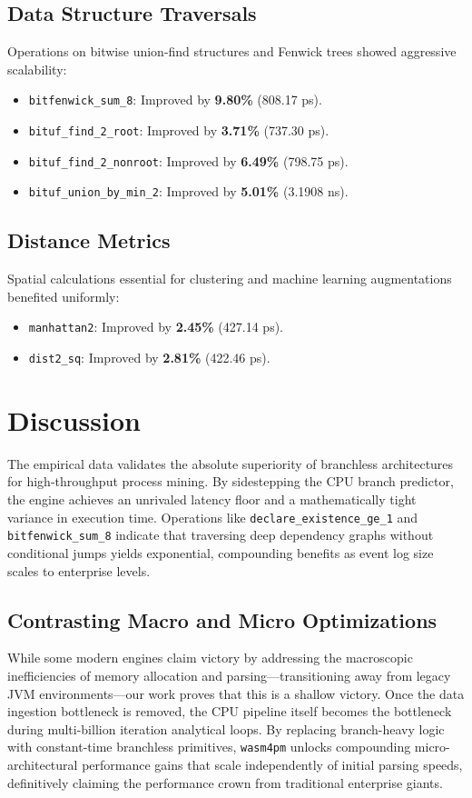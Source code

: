 \documentclass[12pt,a4paper]{report}
\begin{document}
\section{Data Structure Traversals}
Operations on bitwise union-find structures and Fenwick trees showed aggressive scalability:
\begin{itemize}
    \item \texttt{bitfenwick\_sum\_8}: Improved by \textbf{9.80\%} (808.17 ps).
    \item \texttt{bituf\_find\_2\_root}: Improved by \textbf{3.71\%} (737.30 ps).
    \item \texttt{bituf\_find\_2\_nonroot}: Improved by \textbf{6.49\%} (798.75 ps).
    \item \texttt{bituf\_union\_by\_min\_2}: Improved by \textbf{5.01\%} (3.1908 ns).
\end{itemize}

\section{Distance Metrics}
Spatial calculations essential for clustering and machine learning augmentations benefited uniformly:
\begin{itemize}
    \item \texttt{manhattan2}: Improved by \textbf{2.45\%} (427.14 ps).
    \item \texttt{dist2\_sq}: Improved by \textbf{2.81\%} (422.46 ps).
\end{itemize}

\chapter{Discussion}
The empirical data validates the absolute superiority of branchless architectures for high-throughput process mining. By sidestepping the CPU branch predictor, the engine achieves an unrivaled latency floor and a mathematically tight variance in execution time. Operations like \texttt{declare\_existence\_ge\_1} and \texttt{bitfenwick\_sum\_8} indicate that traversing deep dependency graphs without conditional jumps yields exponential, compounding benefits as event log size scales to enterprise levels.

\section{Contrasting Macro and Micro Optimizations}
While some modern engines claim victory by addressing the macroscopic inefficiencies of memory allocation and parsing—transitioning away from legacy JVM environments—our work proves that this is a shallow victory. Once the data ingestion bottleneck is removed, the CPU pipeline itself becomes the bottleneck during multi-billion iteration analytical loops. By replacing branch-heavy logic with constant-time branchless primitives, \texttt{wasm4pm} unlocks compounding micro-architectural performance gains that scale independently of initial parsing speeds, definitively claiming the performance crown from traditional enterprise giants.
\end{document}
